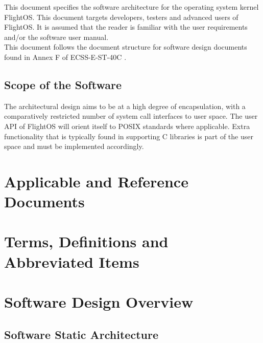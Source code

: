 This document specifies the software architecture for the operating system
kernel FlightOS. This document targets developers, testers and advanced users of
FlightOS. It is assumed that the reader is familiar with the user requirements
and/or the software user manual. \\


\noindent
This document follows the document structure for software design documents 
found in Annex F of ECSS-E-ST-40C \cite{ECSS40C}.


\section{Scope of the Software}

The architectural design aims to be at a high degree of encapsulation, with a
comparatively restricted number of system call interfaces to user space.
The user \gls{API} of FlightOS will orient itself to \gls{POSIX} standards where
applicable. Extra functionality that is typically found in supporting
C libraries is part of the user space and must be implemented accordingly.



\chapter{Applicable and Reference Documents} %

\printbibliography[heading=none]


\chapter{Terms, Definitions and Abbreviated Items}

\printglossary[type=acronym]
\printglossary[type=main, style=altlist]


\chapter{Software Design Overview}



\section{Software Static Architecture}

